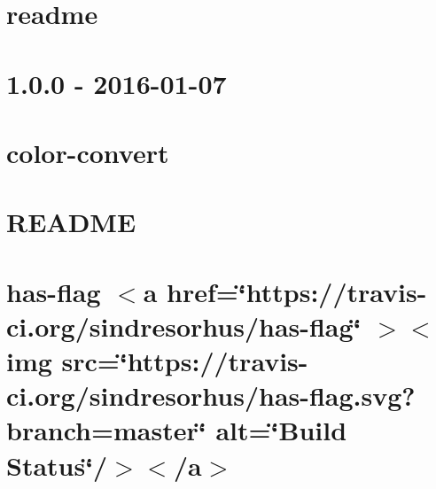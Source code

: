 \documentclass[twoside]{book}
\newcommand{\+}{\discretionary{\mbox{\scriptsize$\hookleftarrow$}}{}{}}
\begin{document}
\chapter{readme}
\label{md__c___users_vaishnavi_jadhav__desktop__developer_code_mean_stack_example_client_node_modules_i1e4f8352db43495158ea1ad9c5014da4}

\chapter{1.0.0 -\/ 2016-\/01-\/07}
\label{md__c___users_vaishnavi_jadhav__desktop__developer_code_mean_stack_example_client_node_modules_id6af6054ef9bd5c50da0842ddeaa531d}

\chapter{color-\/convert}
\label{md__c___users_vaishnavi_jadhav__desktop__developer_code_mean_stack_example_client_node_modules_i55948f6bef8b86ad9391214c3ea68a58}

\chapter{README}
\label{md__c___users_vaishnavi_jadhav__desktop__developer_code_mean_stack_example_client_node_modules_i4e3e7a31d3bce8088b3968e4bf82a24e}

\chapter{has-\/flag \texorpdfstring{$<$}{<}a href=\char`\"{}https\+://travis-\/ci.\+org/sindresorhus/has-\/flag\char`\"{} \texorpdfstring{$>$}{>}\texorpdfstring{$<$}{<}img src=\char`\"{}https\+://travis-\/ci.\+org/sindresorhus/has-\/flag.\+svg?branch=master\char`\"{} alt=\char`\"{}\+Build Status\char`\"{}/\texorpdfstring{$>$}{>}\texorpdfstring{$<$}{<}/a\texorpdfstring{$>$}{>}}
\label{md__c___users_vaishnavi_jadhav__desktop__developer_code_mean_stack_example_client_node_modules_i38d15c421a63c7556a3d4a16b0b260e4}

\end{document}
